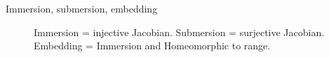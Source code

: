 \documentclass[../main-v2-manifolds.tex]{subfiles}
\begin{document}
\begin{description}
    \item[Immersion, submersion, embedding] Immersion = injective Jacobian. Submersion = surjective Jacobian. Embedding = Immersion and Homeomorphic to range.
    \item[]
\end{description}
\ifSubfilesClassLoaded{%
}{}
\end{document}
